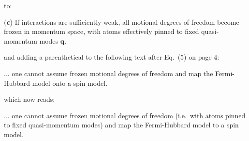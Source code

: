\documentclass[reprint,onecolumn,12pt]{revtex4-2}
\renewcommand{\v}{\bm} %
\newcommand{\red}[1]{{\color{red} #1}}
\newcommand{\green}[1]{{\color{ForestGreen} #1}}
\begin{document}
\begin{enumerate}
  to:

  \green{({\bf c}) If interactions are sufficiently weak, all motional
    degrees of freedom become frozen in momentum space, with atoms
    effectively pinned to fixed quasi-momentum modes $\v q$.}

  and adding a parenthetical to the following text after Eq.~(5) on
  page 4:

  \red{... one cannot assume frozen motional degrees of freedom and
    map the Fermi-Hubbard model onto a spin model.}

  which now reads:

  \green{... one cannot assume frozen motional degrees of freedom
    (i.e.~with atoms pinned to fixed quasi-momentum modes) and map the
    Fermi-Hubbard model to a spin model.}


\end{enumerate}
\end{document}

